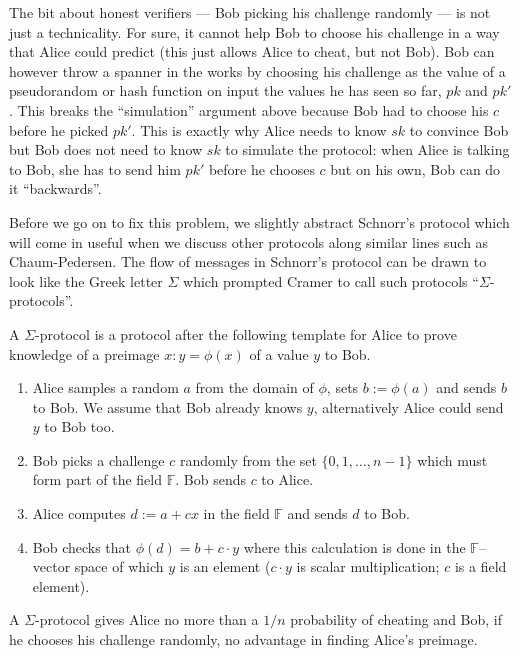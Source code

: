 \documentclass[envcountsame]{llncs}
\begin{document}
The bit about honest verifiers --- Bob picking his challenge randomly --- is not
just a technicality. For sure, it cannot help Bob to choose his challenge in a
way that Alice could predict (this just allows Alice to cheat, but not Bob). Bob
can however throw a spanner in the works by choosing his challenge as the value
of a pseudorandom or hash function on input the values he has seen so far, $pk$
and $pk'$. This breaks the ``simulation'' argument above because Bob had to
choose his $c$ before he picked $pk'$. This is exactly why Alice needs to know
$sk$ to convince Bob but Bob does not need to know $sk$ to simulate the
protocol: when Alice is talking to Bob, she has to send him $pk'$ before he
chooses $c$ but on his own, Bob can do it ``backwards''.

Before we go on to fix this problem, we slightly abstract Schnorr's protocol
which will come in useful when we discuss other protocols along similar lines
such as Chaum-Pedersen. The flow of messages in Schnorr's protocol can be drawn
to look like the Greek letter $\Sigma$ which prompted Cramer \cite{C96} to call
such protocols ``$\Sigma$-protocols''.

\begin{definition}
A $\Sigma$-protocol is a protocol after the following template for Alice to
prove knowledge of a preimage $x: y = \phi(x)$ of a value $y$ to Bob.
\begin{enumerate}
\item Alice samples a random $a$ from the domain of $\phi$, sets $b := \phi(a)$
and sends $b$ to Bob. We assume that Bob already knows $y$, alternatively Alice
could send $y$ to Bob too.
\item Bob picks a challenge $c$ randomly from the set $\{0, 1, \ldots, n-1\}$
which must form part of the field $\mathbb F$. Bob sends $c$ to Alice.
\item Alice computes $d := a + cx$ in the field $\mathbb F$ and sends $d$ to
Bob.
\item Bob checks that $\phi(d) = b + c \cdot y$ where this calculation is done
in the $\mathbb F$--vector space of which $y$ is an element ($c \cdot y$ is
scalar multiplication; $c$ is a field element).
\end{enumerate}
\end{definition}

A $\Sigma$-protocol gives Alice no more than a $1/n$ probability of cheating and
Bob, if he chooses his challenge randomly, no advantage in finding Alice's
preimage.
\end{document}
